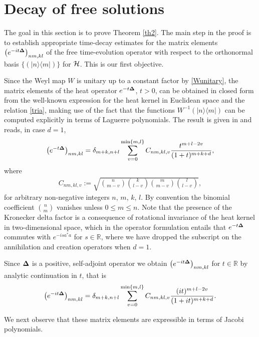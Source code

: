 \documentclass[11pt]{article}
\begin{document}
\section{Decay of free solutions}
\label{secth2}

The goal in this section is to prove Theorem \ref{th2}. The main
step in the proof is to establish appropriate time-decay estimates for the matrix elements
$\left(e^{-it{\bf\Delta}}\right)_{nm,kl}$ of the free time-evolution
operator with respect to the orthonormal basis
$\{(|n\rangle\langle m|)\}$ for ${\cal H}$. This is our f\/irst objective.

Since the Weyl map $W$ is unitary up to a constant factor by \eqref{Wunitary}, the matrix elements of the heat operator $e^{-t{\bf\Delta}}$, $t>0$, can be
obtained in closed form from the well-known  expression for
the heat kernel in Euclidean space and the relation \eqref{tria},
making use of the fact that the functions $W^{-1}(|n\rangle\langle
m|)$ can be computed explicitly in terms of Laguerre polynomials. The
result is given in \cite{Raimar} and reads, in case $d=1$,
\begin{gather*}
\left(e^{-t{\bf\Delta}}\right)_{nm,kl}=
\delta_{m+k,n+l}\sum_{v=0}^{\min\{m,l\}} C_{nm,kl,v}
 \frac{t^{m+l-2v}}{(1+t)^{m+k+d}} ,
\end{gather*}
where
\begin{gather}
\label{matconst}
C_{nm,kl,v}:=
\sqrt{{n\choose m-v}{k\choose l-v}
{m\choose m-v}{l\choose l-v}} ,
\end{gather}
for arbitrary non-negative integers $n$, $m$, $k$, $l$. By convention the
binomial coef\/f\/icient $n\choose m$ vanishes unless $0\leq m\leq n$. Note that the presence of
the Kronecker delta factor is a consequence of rotational invariance
of the heat kernel in two-dimensional space, which in the operator
formulation entails that $ e^{-t{\bf\Delta}}$ commutes with $e^{-isa^*a}$ for
$s\in \mathbb R$, where we have dropped the subscript on the
annihilation and creation operators when $d=1$.

Since ${\bf\Delta}$ is a positive,  self-adjoint operator we obtain
$\left(e^{-it{\bf\Delta}}\right)_{nm,kl}$ for $t\in\mathbb R$ by analytic
continuation in $t$, that is
\begin{gather}
\label{mateluni}
\left(e^{-it{\bf\Delta}}\right)_{nm,kl}=
\delta_{m+k,n+l}\sum_{v=0}^{\min\{m,l\}} C_{nm,kl,v}
 \frac{(it)^{m+l-2v}}{(1+it)^{m+k+d}} .
\end{gather}

We next observe that these  matrix
elements are expressible in terms of Jacobi polynomials.
\end{document}
